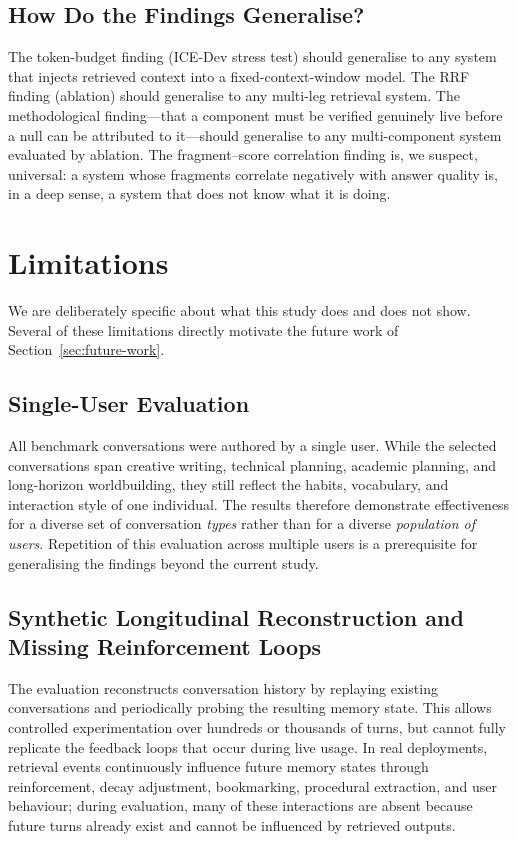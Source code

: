\documentclass[10pt]{article}
\begin{document}
\subsection{How Do the Findings Generalise?}

The token-budget finding (ICE-Dev stress test) should generalise to any system that injects retrieved context into a fixed-context-window model. The RRF finding (ablation) should generalise to any multi-leg retrieval system. The methodological finding---that a component must be verified genuinely live before a null can be attributed to it---should generalise to any multi-component system evaluated by ablation. The fragment--score correlation finding is, we suspect, universal: a system whose fragments correlate negatively with answer quality is, in a deep sense, a system that does not know what it is doing.

\section{Limitations}
\label{sec:limitations}

We are deliberately specific about what this study does and does not show. Several of these limitations directly motivate the future work of Section~\ref{sec:future-work}.

\subsection{Single-User Evaluation}
All benchmark conversations were authored by a single user. While the selected conversations span creative writing, technical planning, academic planning, and long-horizon worldbuilding, they still reflect the habits, vocabulary, and interaction style of one individual. The results therefore demonstrate effectiveness for a diverse set of conversation \emph{types} rather than for a diverse \emph{population of users}. Repetition of this evaluation across multiple users is a prerequisite for generalising the findings beyond the current study.

\subsection{Synthetic Longitudinal Reconstruction and Missing Reinforcement Loops}
The evaluation reconstructs conversation history by replaying existing conversations and periodically probing the resulting memory state. This allows controlled experimentation over hundreds or thousands of turns, but cannot fully replicate the feedback loops that occur during live usage. In real deployments, retrieval events continuously influence future memory states through reinforcement, decay adjustment, bookmarking, procedural extraction, and user behaviour; during evaluation, many of these interactions are absent because future turns already exist and cannot be influenced by retrieved outputs.
\end{document}
